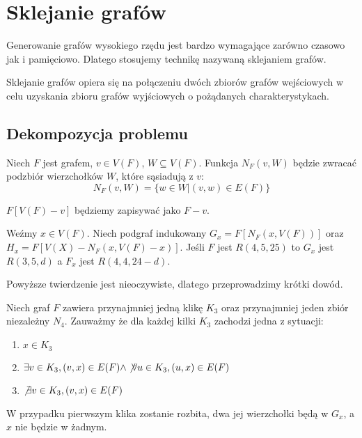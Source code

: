 \chapter{Sklejanie grafów}

Generowanie grafów wysokiego rzędu jest bardzo wymagające zarówno czasowo jak i pamięciowo. Dlatego stosujemy technikę nazywaną sklejaniem grafów. 
\begin{definition}
Sklejanie grafów opiera się na połączeniu dwóch zbiorów grafów wejściowych w celu uzyskania zbioru grafów wyjściowych o pożądanych charakterystykach.
\end{definition}
\section{Dekompozycja problemu}
\begin{definition}
  Niech $F$ jest grafem, $v \in V(F)$, $W \subseteq V(F)$. 
  Funkcja $N_F(v,W)$ będzie zwracać podzbiór wierzchołków $W$, które sąsiadują z $v$: 
  $$N_F(v,W) = \{w \in W | (v,w) \in E(F)\}$$ 
\end{definition}

\begin{definition}
  $F[V(F) - {v}]$ będziemy zapisywać jako $F - v$.
\end{definition}

\begin{theorem}
  Weźmy $x \in V(F)$. Niech podgraf indukowany $G_x = F[N_F(x,V(F))]$
  oraz $H_x = F[V(X) - N_F(x,V(F) - x)]$. Jeśli $F$ jest $R(4,5,25)$ to 
  $G_x$ jest $R(3,5,d)$ a $F_x$ jest $R(4,4,24-d)$.
\end{theorem}


Powyższe twierdzenie jest nieoczywiste, dlatego przeprowadzimy krótki dowód. 


  Niech graf $F$ zawiera przynajmniej jedną klikę $K_3$ oraz przynajmniej jeden zbiór niezależny $N_4$.
  Zauważmy że dla każdej kilki $K_3$ zachodzi jedna z sytuacji:
  \begin{enumerate}
    \item $x \in K_3$
    \item $ \exists v \in K_3, (v, x) \in E(F) \land \not \forall u \in K_3, (u,x) \in E(F)$ 
    \item $\not \exists v \in K_3, (v, x) \in E(F)$
  \end{enumerate} 
  
  W przypadku pierwszym klika zostanie rozbita, dwa jej wierzchołki będą w $G_x$, a $x$ nie będzie w żadnym.
  
